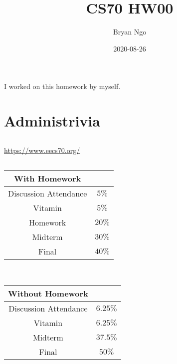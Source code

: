 \documentclass{article}
\title{CS70 HW00}
\author{Bryan Ngo}
\date{2020-08-26}
\begin{document}
\maketitle

I worked on this homework by myself.

\section{Administrivia}

\subsection{}

\url{https://www.eecs70.org/}

\subsection{}

\subsubsection{}

\begin{tabular}{||c|c||}
    \hline
    \textbf{With Homework} & \\
    \hline
    Discussion Attendance & \(5\%\) \\
    Vitamin & \(5\%\) \\
    Homework & \(20\%\) \\
    Midterm & \(30\%\) \\
    Final & \(40\%\) \\
    \hline
\end{tabular} \\
\begin{tabular}{||c|c||}
    \hline
    \textbf{Without Homework} & \\
    \hline
    Discussion Attendance & \(6.25\%\) \\
    Vitamin & \(6.25\%\) \\
    Midterm & \(37.5\%\) \\
    Final & \(50\%\) \\
    \hline
\end{tabular}

\subsubsection{}
\end{document}
